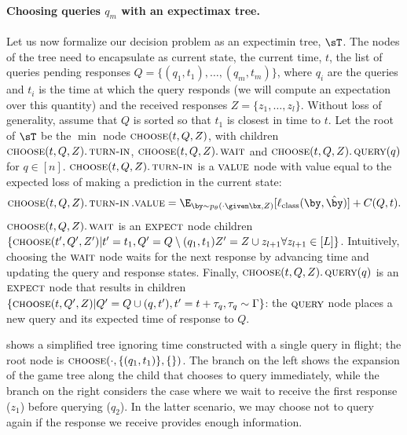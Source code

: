 \paragraph{Choosing queries $q_m$ with an expectimax tree.}
Let us now formalize our decision problem as an expectimin tree, $\sT$.
The nodes of the tree need to encapsulate as current state, the current time, $t$, the list of queries pending responses $Q = \{(q_1, t_1), \ldots, (q_m, t_m)\}$, where $q_i$ are the queries and $t_i$ is the time at which the query responds (we will compute an expectation over this quantity) and the received responses $Z = \{z_1, \ldots, z_l\}$.
Without loss of generality, assume that $Q$ is sorted so that $t_1$ is closest in time to $t$.
Let the root of $\sT$ be the $\min$ node $\operatorname{\textsc{choose}}(t, Q, Z)$, 
with children $\operatorname{\textsc{choose}}(t, Q, Z).\operatorname{\textsc{turn-in}}$, $\operatorname{\textsc{choose}}(t, Q, Z).\operatorname{\textsc{wait}}$ and $\operatorname{\textsc{choose}}(t, Q, Z).\operatorname{\textsc{query}}(q)$ for $q \in [n]$.
$\operatorname{\textsc{choose}}(t, Q, Z).\operatorname{\textsc{turn-in}}$ is a $\textsc{value}$ node with value equal to the expected loss of making a prediction in the current state:
\[
\scchoose(t, Q, Z).\turnin.\scvalue 
= \E_{\by \sim \p(\cdot \given \bx, Z)}[\ell_{\rmclass}(\by, \byt)] + C(Q, t).
\]
$\operatorname{\textsc{choose}}(t, Q, Z).\operatorname{\textsc{wait}}$ is an $\textsc{expect}$ node children $\{\operatorname{\textsc{choose}}(t', Q', Z') | t' = t_1, Q' = Q \setminus (q_1, t_1) Z' = Z \cup {z_{l+1}} \forall z_{l+1} \in [L]\}$.
Intuitively, choosing the $\operatorname{\textsc{wait}}$ node waits for the next response by advancing time and updating the query and response states.
Finally,
$\operatorname{\textsc{choose}}(t, Q, Z).\operatorname{\textsc{query}}(q)$ is an $\textsc{expect}$ node that results in children 
$\{\operatorname{\textsc{choose}}(t, Q', Z) | Q' = Q \cup (q, t'), t' = t + \tau_q, \tau_q \sim \Gamma\}$: the $\operatorname{\textsc{query}}$ node places a new query and its expected time of response to $Q$. 

 shows a simplified tree ignoring time constructed with a single query in flight; the root node is $\operatorname{\textsc{choose}}(\cdot, \{(q_1, t_1)\}, \{\})$. The branch on the left shows the expansion of the game tree along the child that chooses to query immediately, while the branch on the right considers the case where we wait to receive the first response ($z_1$) before querying ($q_2$).
In the latter scenario, we may choose not to query again if the response we receive provides enough information.



